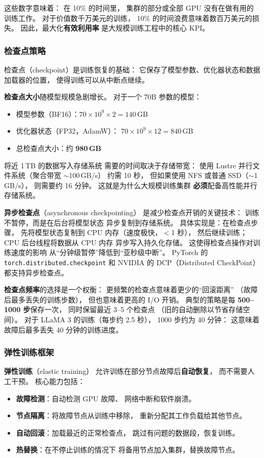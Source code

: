 这些数字意味着：
在 10\% 的时间里，
集群的部分或全部 GPU 没有在做有用的训练工作。
对于价值数千万美元的训练，
10\% 的时间浪费意味着数百万美元的损失。
因此，最大化\textbf{有效利用率}
是大规模训练工程中的核心 KPI。

\subsubsection{检查点策略}

检查点（checkpoint）是训练恢复的基础：
它保存了模型参数、优化器状态和数据加载器的位置，
使得训练可以从中断点继续。

\textbf{检查点大小}随模型规模急剧增长。
对于一个 70B 参数的模型：
\begin{itemize}[noitemsep]
  \item 模型参数（BF16）：$70 \times 10^9 \times 2 = 140$\,GB
  \item 优化器状态（FP32，AdamW）：
        $70 \times 10^9 \times 12 = 840$\,GB
  \item 总检查点大小：约 \textbf{980\,GB}
\end{itemize}

将近 1\,TB 的数据写入存储系统
需要的时间取决于存储带宽：
使用 Lustre 并行文件系统（聚合带宽 $\sim$100\,GB/s）
约需 10 秒，
但如果使用 NFS 或普通 SSD（$\sim$1\,GB/s），
则需要约 16 分钟。
这就是为什么大规模训练集群
\textbf{必须}配备高性能并行存储系统。

\textbf{异步检查点}（asynchronous checkpointing）
是减少检查点开销的关键技术：
训练不暂停，而是在后台将模型状态
异步复制到存储系统。
具体实现是：在检查点步骤，
先将模型状态复制到 CPU 内存（速度极快，$<$1 秒），
然后继续训练；
CPU 后台线程将数据从 CPU 内存
异步写入持久化存储。
这使得检查点操作对训练速度的影响
从“分钟级暂停”降低到“亚秒级中断”。
PyTorch 的 \texttt{torch.distributed.checkpoint}
和 NVIDIA 的 DCP（Distributed CheckPoint）
都支持异步检查点。

\textbf{检查点频率}的选择是一个权衡：
更频繁的检查点意味着更少的“回滚距离”
（故障后最多丢失的训练步数），
但也意味着更高的 I/O 开销。
典型的策略是每 \textbf{500--1000 步}保存一次，
同时保留最近 3--5 个检查点
（旧的自动删除以节省存储空间）。
对于 LLaMA 3 的训练（每步约 2.5 秒），
1000 步约为 40 分钟：
这意味着故障后最多丢失 40 分钟的训练进度。

\subsubsection{弹性训练框架}

\textbf{弹性训练}（elastic training）
允许训练在部分节点故障后\textbf{自动恢复}，
而不需要人工干预。
核心能力包括：
\begin{itemize}[noitemsep]
  \item \textbf{故障检测}：自动检测 GPU 故障、
        网络中断和软件崩溃。
  \item \textbf{节点隔离}：将故障节点从训练中移除，
        重新分配其工作负载给其他节点。
  \item \textbf{自动回滚}：加载最近的正常检查点，
        跳过有问题的数据段，恢复训练。
  \item \textbf{热替换}：在不停止训练的情况下
        将备用节点加入集群，替换故障节点。
\end{itemize}

